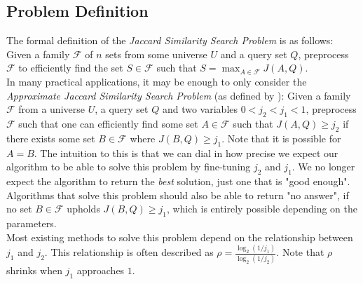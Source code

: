 \subsection{Problem Definition}
The formal definition of the \textit{Jaccard Similarity Search Problem} is as follows:
Given a family $\mathcal{F}$ of $n$ sets from some universe $U$ and a query set $Q$, preprocess $\mathcal{F}$ to efficiently find the set $S\in \mathcal{F}$ such that $S = \max_{A\in \mathcal{F}}J(A,Q)$. \\
In many practical applications, it may be enough to only consider the \textit{Approximate Jaccard Similarity Search Problem} (as defined by \citet{fast-similarity-search}): Given a family $\mathcal{F}$ from a universe $U$, a query set $Q$ and two variables $0 < j_2 < j_1 < 1$, preprocess $\mathcal{F}$ such that one can efficiently find some set $A \in \mathcal{F}$ such that $J(A,Q) \geq j_2$ if there exists some set $B \in \mathcal{F}$ where $J(B,Q) \geq j_1$. Note that it is possible for $A = B$. The intuition to this is that we can dial in how precise we expect our algorithm to be able to solve this problem by fine-tuning $j_2$ and $j_1$. We no longer expect the algorithm to return the \textit{best} solution, just one that is "good enough". Algorithms that solve this problem should also be able to return "no answer", if no set $B\in \mathcal{F}$ upholds $J(B,Q)\geq j_1$, which is entirely possible depending on the parameters. \\
Most existing methods to solve this problem depend on the relationship between $j_1$ and $j_2$. This relationship is often described as $\rho=\frac{\log_2(1/j_1)}{\log_2(1/j_2)}$. Note that $\rho$ shrinks when $j_1$ approaches $1$.

